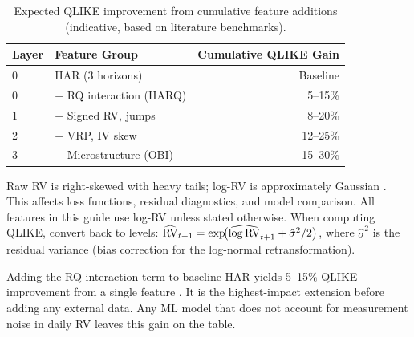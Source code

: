 \begin{table}[htbp]
\centering
\caption{Expected QLIKE improvement from cumulative feature additions (indicative, based on literature benchmarks).}
\label{tab:marginal-gains}
\small
\begin{tabular}{@{}llr@{}}
\toprule
\textbf{Layer} & \textbf{Feature Group} & \textbf{Cumulative QLIKE Gain} \\
\midrule
0 & HAR (3 horizons)          & Baseline \\
0 & $+$ RQ interaction (HARQ) & 5--15\% \\
1 & $+$ Signed RV, jumps      & 8--20\% \\
2 & $+$ VRP, IV skew           & 12--25\% \\
3 & $+$ Microstructure (OBI)   & 15--30\% \\
\bottomrule
\end{tabular}
\end{table}



\begin{warning}
Raw RV is right-skewed with heavy tails; log-RV is approximately Gaussian \citep{ABDL2001}.
This affects loss functions, residual diagnostics, and model comparison.
All features in this guide use log-RV unless stated otherwise.
When computing QLIKE, convert back to levels: $\widehat{\operatorname{RV}}_{t+1} = \exp\!\bigl(\widehat{\log \operatorname{RV}}_{t+1} + \hat{\sigma}^2/2\bigr)$, where $\hat{\sigma}^2$ is the residual variance (bias correction for the log-normal retransformation).
\end{warning}

\begin{keyidea}
Adding the RQ interaction term to baseline HAR yields 5--15\% QLIKE improvement from a single feature \citep{BPQ2016}.
It is the highest-impact extension before adding any external data.
Any ML model that does not account for measurement noise in daily RV leaves this gain on the table.
\end{keyidea}
